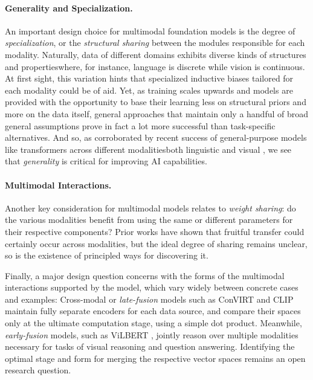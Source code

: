 \paragraph{Generality and Specialization.} An important design choice for multimodal foundation models is the degree of \textit{specialization}, or the  \textit{structural sharing} between the modules responsible for each modality. Naturally, data of different domains exhibits diverse kinds of structures and properties\dash{}where, for instance, language is discrete while vision is continuous. At first sight, this variation hints that specialized inductive biases tailored for each modality could be of aid. Yet, as training scales upwards and models are provided with the opportunity to base their learning less on structural priors and more on the data itself, general approaches that maintain only a handful of broad general assumptions prove in fact a lot more successful than task-specific alternatives. And so, as corroborated by recent success of general-purpose models like transformers across different modalities\dash{}both linguistic \citep{liu2019roberta,albert} and visual \citep{visual_transformer,ganformer}, we see that \textit{generality} is critical for improving AI capabilities.

\paragraph{Multimodal Interactions.} Another key consideration for multimodal models relates to \textit{weight sharing}: do the various modalities benefit from using the same or different parameters for their respective components? Prior works have shown that fruitful transfer could certainly occur across modalities, but the ideal degree of sharing remains unclear, so is the existence of principled ways for discovering it. 

Finally, a major design question concerns with the forms of the multimodal interactions supported by the model, which vary widely between concrete cases and examples: Cross-modal or \textit{late-fusion} models such as ConVIRT \citep{convirt} and CLIP \citep{radford2021learning} maintain fully separate encoders for each data source, and compare their spaces only at the ultimate computation stage, using \eg a simple dot product. Meanwhile, \textit{early-fusion} models, such as ViLBERT \citep{Lu2019ViLBERTPT, cho2021unifying}, jointly reason over multiple modalities necessary for tasks of visual reasoning and question answering. Identifying the optimal stage and form for merging the respective vector spaces \citep{attention_bottlenecks} remains an open research question.

